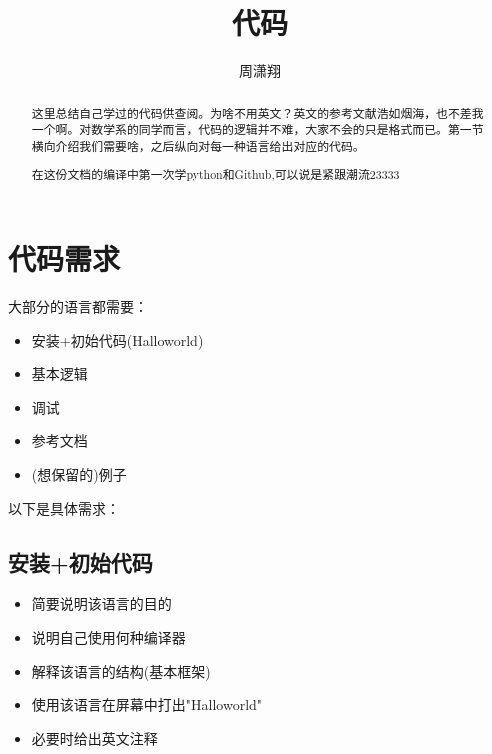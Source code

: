 \documentclass[11pt]{amsart}
\begin{document}
\date{}

\title
{代码}


\author{周潇翔}
\address{School of Mathematical Sciences\\
University of Science and Technology of China\\
Hefei, 230026\\ P.R. China\\} 





\begin{abstract}
这里总结自己学过的代码供查阅。为啥不用英文？英文的参考文献浩如烟海，也不差我一个啊。对数学系的同学而言，代码的逻辑并不难，大家不会的只是格式而已。第一节横向介绍我们需要啥，之后纵向对每一种语言给出对应的代码。

在这份文档的编译中第一次学python和Github,可以说是紧跟潮流23333
\end{abstract}



\maketitle


\section{代码需求}

大部分的语言都需要：
\begin{itemize}
	\item 安装+初始代码(Halloworld)
	\item 基本逻辑
	\item 调试
	\item 参考文档
	\item (想保留的)例子
\end{itemize}
以下是具体需求：
\subsection{安装+初始代码}
\begin{itemize}
	\item 简要说明该语言的目的
	\item 说明自己使用何种编译器
	\item 解释该语言的结构(基本框架)
	\item 使用该语言在屏幕中打出"Halloworld"
	\item 必要时给出英文注释
\end{itemize}
\end{document}
